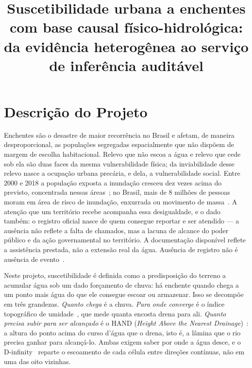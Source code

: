 \documentclass[conference]{IEEEtran}
\begin{document}
\title{Suscetibilidade urbana a enchentes com base causal
físico-hidrológica: da evidência heterogênea ao serviço de inferência
auditável}

\author{
}

\maketitle

\section{Descrição do Projeto}

Enchentes são o desastre de maior recorrência no Brasil e afetam, de
maneira desproporcional, as populações segregadas espacialmente que não
dispõem de margem de escolha habitacional. Relevo que não escoa a água e
relevo que cede sob ela são duas faces da mesma vulnerabilidade física; da
inviabilidade desse relevo nasce a ocupação urbana precária, e dela, a
vulnerabilidade social. Entre 2000 e 2018 a população exposta a inundação
cresceu dez vezes acima do previsto, concentrada nessas áreas~\cite{tellman2021};
no Brasil, mais de 8 milhões de pessoas moram em área de risco de inundação,
enxurrada ou movimento de massa~\cite{ibge2018risco}. A atenção que um
território recebe acompanha essa desigualdade, e o dado também: o registro
oficial nasce de quem consegue reportar e ser atendido --- a ausência não
reflete a falta de chamados, mas a lacuna de alcance do poder público e da
ação governamental no território. A documentação disponível reflete a
assistência prestada, não a extensão real da água. Ausência de registro não
é ausência de evento~\cite{li2022pul,agostini2024}.

Neste projeto, suscetibilidade é definida como a predisposição do terreno a
acumular água sob um dado forçamento de chuva: há enchente quando chega a um
ponto mais água do que ele consegue escoar ou armazenar. Isso se decompõe em
três grandezas. \emph{Quanto chega} é a chuva. \emph{Para onde converge} é
o índice topográfico de umidade~\cite{beven1979}, que mede quanta encosta
drena para ali. \emph{Quanto precisa subir para ser alcançado} é
o HAND (\emph{Height Above the Nearest Drainage})~\cite{renno2008}: a altura do ponto acima do curso d'água que o drena, isto
é, a lâmina que o rio precisa ganhar para alcançá-lo. Ambas exigem saber por
onde a água desce, e o D-infinity~\cite{tarboton1997} reparte o escoamento de
cada célula entre direções contínuas, não em uma das oito vizinhas.
\end{document}
